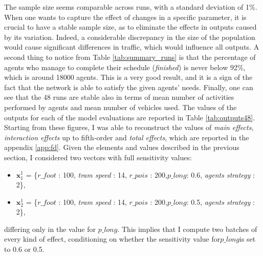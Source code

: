 The sample size seems comparable across runs, with a standard deviation of 1\%. When one wants to capture the effect of changes in a specific parameter, it is crucial to have a stable sample size, as to eliminate the effects in outputs caused by its variation. Indeed, a considerable discrepancy in the size of the population would cause significant differences in traffic, which would influence all outputs. A second thing to notice from Table \ref{tab:summary_runs} is that the percentage of agents who manage to complete their schedule (\textit{finished}) is never below 92\%, which is around 18000 agents. This is a very good result, and it is a sign of the fact that the network is able to satisfy the given agents' needs. Finally, one can see that the 48 runs are stable also in terms of mean number of activities performed by agents and mean number of vehicles used. The values of the outputs for each of the model evaluations are reported in Table \ref{tab:outputs48}. Starting from these figures, I was able to reconstruct the values of \textit{main effects}, \textit{interaction effects} up to fifth-order and \textit{total effects}, which are reported in the appendix \ref{app:fd}. Given the elements and values described in the previous section, I considered two vectors with full sensitivity values:
\begin{itemize}
    \item $\mathbf{x}^1_1$ = \{$r\_foot$ : 100, \textit{tram speed} : 14, $r\_pois$ : 200,$p\_long$: 0.6, \textit{agents strategy} : 2\},
    \item $\mathbf{x}^1_2$ = \{$r\_foot$ : 100, \textit{tram speed} : 14, $r\_pois$ : 200,$p\_long$: 0.5, \textit{agents strategy} : 2\},
\end{itemize}
differing only in the value for $p\_long$. This implies that I compute two batches of every kind of effect, conditioning on whether the sensitivity value for$p\_long$is set to 0.6 or 0.5. 

